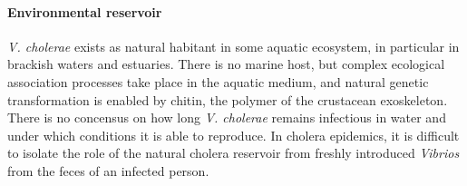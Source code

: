  \paragraph{Environmental reservoir}  \textit{V. cholerae} exists as natural habitant in some aquatic ecosystem, in particular in brackish waters and estuaries. There is no marine host, but complex ecological association processes take place in the aquatic medium, and natural genetic transformation is enabled by chitin, the polymer of the crustacean exoskeleton\cite{Reidl:VibrioCholeraeCholera:2002,Meibom:ChitinInducesNatural:2005}. There is no concensus on how long \textit{V. cholerae} remains infectious in water and under which conditions it is able to reproduce\cite{Mavian:ToxigenicVibrioCholerae:2020}. In cholera epidemics, it is difficult to isolate the role of the natural cholera reservoir from freshly introduced \textit{Vibrios} from the feces of an infected person.
 
